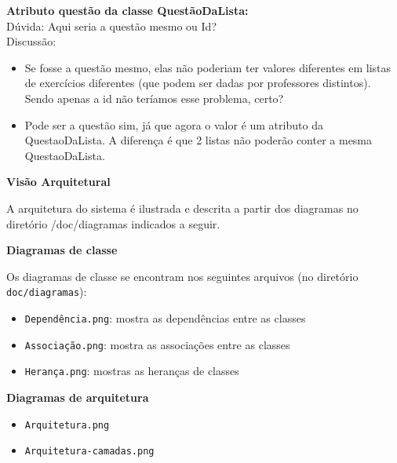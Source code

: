 \documentclass[12pt,letterpaper]{article}
\begin{document}
\textbf{Atributo questão da classe QuestãoDaLista:}\\
Dúvida: Aqui seria a questão mesmo ou Id?\\
\newline
Discussão:
\begin{itemize}
\item{}Se fosse a questão mesmo, elas não poderiam ter valores diferentes em listas de exercícios diferentes (que podem ser dadas por professores distintos). Sendo apenas a id não teríamos esse problema, certo?
\item{}Pode ser a questão sim, já que agora o valor é um atributo da QuestaoDaLista. A diferença é que 2 listas não poderão conter a mesma QuestaoDaLista.
\end{itemize}



\pagebreak

\vspace{1cm}
{\large {\bf Visão Arquitetural}}
\vspace{0.5cm}

A arquitetura do sistema é ilustrada e descrita a partir dos diagramas no diretório /doc/diagramas indicados a seguir.

\vspace{1cm}
{\large {\bf Diagramas de classe}}
\vspace{0.5cm}

Os diagramas de classe se encontram nos seguintes arquivos (no diretório \texttt{doc/diagramas}):

\begin{itemize}
\item{}\texttt{Dependência.png}: mostra as dependências entre as classes
\item{}\texttt{Associação.png}: mostra as associações entre as classes
\item{}\texttt{Herança.png}: mostras as heranças de classes
\end{itemize}

\vspace{1cm}
{\large {\bf Diagramas de arquitetura}}
\vspace{0.5cm}
\begin{itemize}
\item{}\texttt{Arquitetura.png}
\item{}\texttt{Arquitetura-camadas.png}
\end{itemize}

\pagebreak
\end{document}
